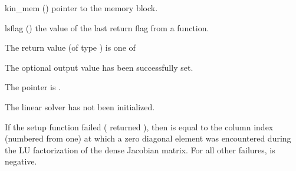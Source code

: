 {
  \begin{args}
  \item[kin\_mem] ()
    pointer to the {\kinsol} memory block.
  \item[lsflag] ()
    the value of the last return flag from a {\kindense} function.
  \end{args}
}
{
  The return value  (of type ) is one of
  \begin{args}
  \item[\Id{KINDLS\_SUCCESS}] 
    The optional output value has been successfully set.
  \item[\Id{KINDLS\_MEM\_NULL}]
    The  pointer is .
  \item[\Id{KINDLS\_LMEM\_NULL}]
    The {\kindense} linear solver has not been initialized.
  \end{args}
}
{
  If the {\kindls} setup function failed ( returned ),
  then  is equal to the column index (numbered from one) at which
  a zero diagonal element was encountered during the LU factorization of the 
  dense Jacobian matrix.  For all other failures,  is negative.
}

